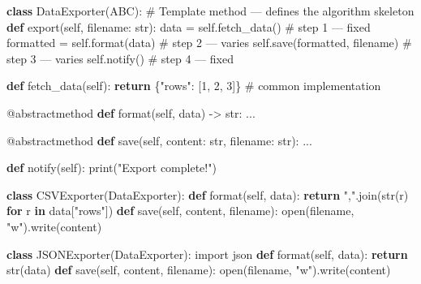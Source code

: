 \documentclass[11pt]{article}
\newenvironment{Shaded}{\begin{snugshade}}{\end{snugshade}}
\newcommand{\AttributeTok}[1]{\textcolor[rgb]{0.16,0.50,0.73}{#1}}
\newcommand{\BuiltInTok}[1]{\textcolor[rgb]{0.50,0.55,0.55}{#1}}
\newcommand{\CommentTok}[1]{\textcolor[rgb]{0.48,0.49,0.49}{#1}}
\newcommand{\ControlFlowTok}[1]{\textcolor[rgb]{0.99,0.74,0.29}{\textbf{#1}}}
\newcommand{\DecValTok}[1]{\textcolor[rgb]{0.96,0.45,0.00}{#1}}
\newcommand{\ImportTok}[1]{\textcolor[rgb]{0.15,0.68,0.38}{#1}}
\newcommand{\KeywordTok}[1]{\textcolor[rgb]{0.81,0.81,0.76}{\textbf{#1}}}
\newcommand{\NormalTok}[1]{\textcolor[rgb]{0.81,0.81,0.76}{#1}}
\newcommand{\OperatorTok}[1]{\textcolor[rgb]{0.81,0.81,0.76}{#1}}
\newcommand{\StringTok}[1]{\textcolor[rgb]{0.96,0.31,0.31}{#1}}
\newcommand{\VariableTok}[1]{\textcolor[rgb]{0.15,0.68,0.68}{#1}}
\begin{document}
\begin{Shaded}
\begin{Highlighting}[]
\KeywordTok{class}\NormalTok{ DataExporter(ABC):}
    \CommentTok{\# Template method — defines the algorithm skeleton}
    \KeywordTok{def}\NormalTok{ export(}\VariableTok{self}\NormalTok{, filename: }\BuiltInTok{str}\NormalTok{):}
\NormalTok{        data }\OperatorTok{=} \VariableTok{self}\NormalTok{.fetch\_data()         }\CommentTok{\# step 1 — fixed}
\NormalTok{        formatted }\OperatorTok{=} \VariableTok{self}\NormalTok{.}\BuiltInTok{format}\NormalTok{(data)    }\CommentTok{\# step 2 — varies}
        \VariableTok{self}\NormalTok{.save(formatted, filename)   }\CommentTok{\# step 3 — varies}
        \VariableTok{self}\NormalTok{.notify()                    }\CommentTok{\# step 4 — fixed}

    \KeywordTok{def}\NormalTok{ fetch\_data(}\VariableTok{self}\NormalTok{):}
        \ControlFlowTok{return}\NormalTok{ \{}\StringTok{"rows"}\NormalTok{: [}\DecValTok{1}\NormalTok{, }\DecValTok{2}\NormalTok{, }\DecValTok{3}\NormalTok{]\}      }\CommentTok{\# common implementation}

    \AttributeTok{@abstractmethod}
    \KeywordTok{def} \BuiltInTok{format}\NormalTok{(}\VariableTok{self}\NormalTok{, data) }\OperatorTok{{-}\textgreater{}} \BuiltInTok{str}\NormalTok{: ...}

    \AttributeTok{@abstractmethod}
    \KeywordTok{def}\NormalTok{ save(}\VariableTok{self}\NormalTok{, content: }\BuiltInTok{str}\NormalTok{, filename: }\BuiltInTok{str}\NormalTok{): ...}

    \KeywordTok{def}\NormalTok{ notify(}\VariableTok{self}\NormalTok{):}
        \BuiltInTok{print}\NormalTok{(}\StringTok{"Export complete!"}\NormalTok{)}

\KeywordTok{class}\NormalTok{ CSVExporter(DataExporter):}
    \KeywordTok{def} \BuiltInTok{format}\NormalTok{(}\VariableTok{self}\NormalTok{, data): }\ControlFlowTok{return} \StringTok{","}\NormalTok{.join(}\BuiltInTok{str}\NormalTok{(r) }\ControlFlowTok{for}\NormalTok{ r }\KeywordTok{in}\NormalTok{ data[}\StringTok{"rows"}\NormalTok{])}
    \KeywordTok{def}\NormalTok{ save(}\VariableTok{self}\NormalTok{, content, filename): }\BuiltInTok{open}\NormalTok{(filename, }\StringTok{"w"}\NormalTok{).write(content)}

\KeywordTok{class}\NormalTok{ JSONExporter(DataExporter):}
    \ImportTok{import}\NormalTok{ json}
    \KeywordTok{def} \BuiltInTok{format}\NormalTok{(}\VariableTok{self}\NormalTok{, data): }\ControlFlowTok{return} \BuiltInTok{str}\NormalTok{(data)}
    \KeywordTok{def}\NormalTok{ save(}\VariableTok{self}\NormalTok{, content, filename): }\BuiltInTok{open}\NormalTok{(filename, }\StringTok{"w"}\NormalTok{).write(content)}
\end{Highlighting}
\end{Shaded}
\end{document}
